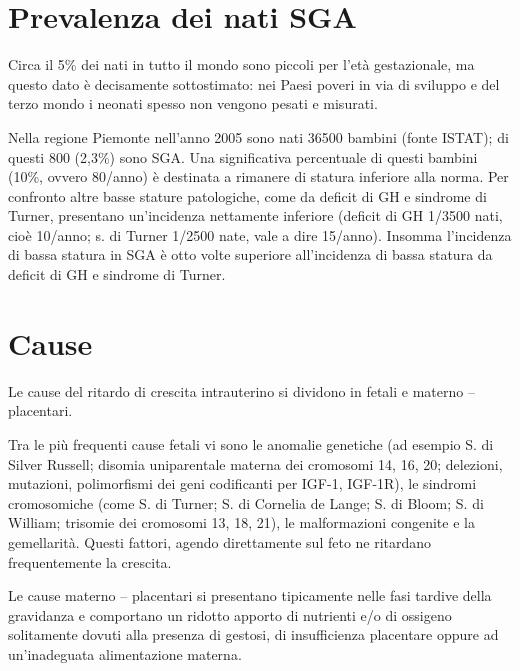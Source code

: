 \section{Prevalenza dei nati SGA}

Circa il 5\% dei nati in tutto il mondo sono piccoli per l'età gestazionale, 
ma questo dato è decisamente sottostimato: nei Paesi poveri in via di sviluppo 
e del terzo mondo i neonati spesso non vengono pesati e misurati\cite{novonordisk}.

Nella regione Piemonte nell'anno 2005 sono nati 36500 bambini (fonte ISTAT); di questi 800 (2,3\%) sono SGA. Una significativa percentuale di questi bambini (10\%, ovvero 80/anno) è destinata a rimanere di statura inferiore alla norma. Per confronto altre basse stature patologiche, come da deficit di GH e sindrome di Turner, presentano un'incidenza nettamente inferiore (deficit di GH 1/3500 nati, cioè 10/anno; s. di Turner 1/2500 nate, vale a dire 15/anno). Insomma l'incidenza di bassa statura in SGA è otto volte superiore all'incidenza di bassa statura da deficit di GH e sindrome di Turner. 


\section{Cause}


Le cause del ritardo di crescita intrauterino si dividono in
fetali e materno -- placentari.


Tra le più frequenti cause fetali vi sono le anomalie genetiche (ad esempio S. di Silver Russell; disomia uniparentale materna dei cromosomi 14, 16, 20; delezioni, mutazioni, polimorfismi dei geni codificanti per IGF-1, IGF-1R), le sindromi cromosomiche (come S. di Turner; S. di Cornelia de Lange; S. di Bloom; S. di William; trisomie dei cromosomi 13, 18, 21), le malformazioni congenite e la gemellarità. Questi fattori, agendo direttamente sul feto ne ritardano frequentemente la crescita.


Le cause materno -- placentari si presentano tipicamente nelle fasi tardive della gravidanza
e comportano un ridotto apporto di nutrienti e/o di ossigeno solitamente dovuti alla presenza di 
gestosi, di insufficienza placentare oppure ad un'inadeguata alimentazione materna.


